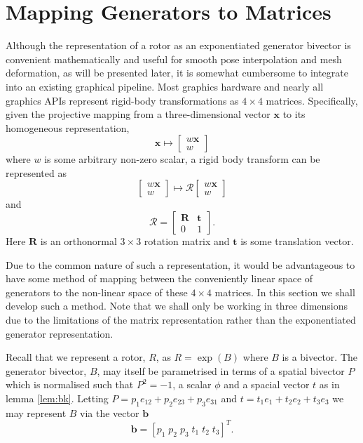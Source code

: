 

\section{Mapping Generators to Matrices}

Although the representation of a rotor as an exponentiated generator bivector
is convenient mathematically and useful for smooth pose interpolation
and mesh deformation, as will be presented later, it is somewhat cumbersome
to integrate into an existing graphical pipeline. Most graphics hardware and
nearly all graphics APIs represent rigid-body transformations as $4 \times 4$ matrices.
Specifically, given the projective mapping from a three-dimensional vector $\mathbf{x}$ to
its homogeneous representation,
\[
\mathbf{x} \mapsto \left[ \begin{array}{c}
w \mathbf{x} \\ w
\end{array}\right]
\]
where $w$ is some arbitrary non-zero scalar, a rigid body transform can be represented as
\[
 \left[ \begin{array}{c}
w \mathbf{x} \\ w
\end{array}\right]
\mapsto
 \mathcal{R}\left[ \begin{array}{c}
w \mathbf{x} \\ w
\end{array}\right]
\]
and
\[
\mathcal{R} = \left[
\begin{array}{cc}
\mathbf{R} & \mathbf{t} \\
                0 & 1
\end{array}
\right].
\]
Here $\mathbf{R}$ is an orthonormal $3 \times 3$ rotation matrix and $\mathbf{t}$ is some
translation vector.

Due to the common nature of such a representation, it would be advantageous to
have some method of mapping between the conveniently linear space of
generators to the non-linear space of these $4 \times 4$ matrices.
In this section we shall develop such a method. Note that we shall only be
working in three dimensions due to the limitations of the matrix
representation rather than the exponentiated generator representation.

Recall that we represent a rotor, $R$, as $R = \exp(B)$ where $B$ is a bivector.
The generator bivector, $B$, may itself be
parametrised in terms of a spatial bivector $P$ which is normalised such that
$P^2 = -1$, a scalar $\phi$ and a spacial vector $t$
as in lemma \ref{lem:bk}.
Letting $P = p_1 e_{12} + p_2 e_{23} + p_3 e_{31}$ and
$t = t_1 e_1 + t_2 e_2 + t_3 e_3$ we may represent $B$ via the
vector $\mathbf{b}$
\[
\mathbf{b} = [ p_1 \; p_2 \; p_3 \; t_1 \; t_2 \; t_3 ]^T.
\]

